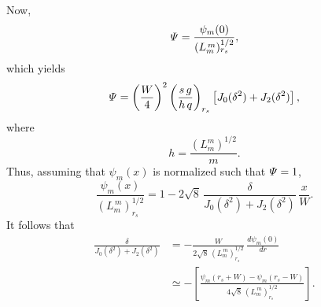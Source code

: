 \documentclass[12pt,prb,aps,notitlepage]{revtex4-1}
\begin{document}
Now,
\begin{equation}
{\mit\Psi} = \frac{\psi_m(0)}{(L_m^{\,m})_{r_s}^{1/2}},
\end{equation}
which yields
\begin{equation}
{\mit\Psi} = \left(\frac{W}{4}\right)^2\left(\frac{s\,g}{h\,q}\right)_{r_s}\left[J_0(\delta^2)+ J_2(\delta^2)\right],
\end{equation}
where
\begin{equation}
h = \frac{(L_m^m)^{1/2}}{m}.
\end{equation}
Thus, assuming that $\psi_m(x)$ is normalized such that ${\mit\Psi}=1$, 
\begin{equation}
\frac{\psi_m(x)}{(L_m^{\,m})^{1/2}_{r_s}} =1 - 2\sqrt{8}\,\frac{\delta}{J_0(\delta^2)+ J_2(\delta^2)}\,\frac{x}{W}.
\end{equation}
It follows that
\begin{align}
\frac{\delta}{J_0(\delta^2)+J_2(\delta^2)} &= -\frac{W}{2\sqrt{8}\,(L_m^{\,m})^{1/2}_{r_s}}\,\frac{d\psi_m(0)}{dr}\nonumber\\[0.5ex]
&\simeq -\left[\frac{\psi_m(r_s+W)-\psi_m(r_s-W)}{4\sqrt{8}\,(L_m^{\,m})^{1/2}_{r_s}}\right].
\end{align}
\end{document}
